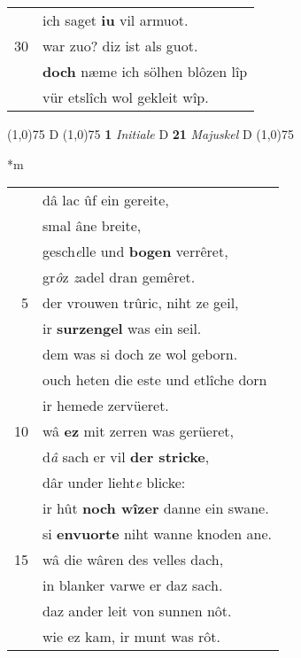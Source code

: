 \documentclass[8pt,a4paper,notitlepage]{article}
\begin{document}
\begin{table}[ht]
\begin{minipage}[t]{0.5\linewidth}
\begin{tabular}{rl}
 & ich saget \textbf{iu} vil armuot.\\ 
30 & war zuo? diz ist als guot.\\ 
 & \textbf{doch} næme ich sölhen blôzen lîp\\ 
 & vür etslîch wol gekleit wîp.\\ 
\end{tabular}
\scriptsize
\line(1,0){75} \newline
D \newline
\line(1,0){75} \newline
\textbf{1} \textit{Initiale} D  \textbf{21} \textit{Majuskel} D  \newline
\line(1,0){75} \newline
\newline
\end{minipage}
\hspace{0.5cm}
\begin{minipage}[t]{0.5\linewidth}
\small
\begin{center}*m
\end{center}
\begin{tabular}{rl}
 & dâ lac ûf ein gereite,\\ 
 & smal âne breite,\\ 
 & gesch\textit{e}lle und \textbf{bogen} verrêret,\\ 
 & gr\textit{ô}z \textit{z}adel dran gemêret.\\ 
5 & der vrouwen trûric, niht ze geil,\\ 
 & ir \textbf{surzengel} was ein seil.\\ 
 & dem was si doch ze wol geborn.\\ 
 & ouch heten die este und etlîche dorn\\ 
 & ir hemede zervüeret.\\ 
10 & wâ \textbf{ez} mit zerren was gerüeret,\\ 
 & d\textit{â} sach er vil \textbf{der stricke},\\ 
 & dâr under lieht\textit{e} blicke:\\ 
 & ir hût \textbf{noch wîzer} danne ein swane.\\ 
 & si \textbf{en}\textbf{vuorte} niht wanne knoden ane.\\ 
15 & wâ die wâren des velles dach,\\ 
 & in blanker varwe er daz sach.\\ 
 & daz ander leit von sunnen nôt.\\ 
 & wie ez kam, ir munt was rôt.\\ 

\end{tabular}
\end{minipage}
\end{table}
\end{document}
